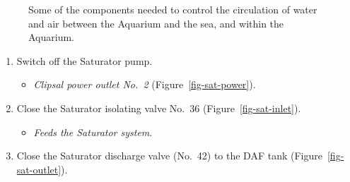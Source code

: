 \documentclass[
  12pt,
]{report}
\providecommand{\tightlist}{%
  \setlength{\itemsep}{0pt}\setlength{\parskip}{0pt}}\usepackage{longtable,booktabs,array}
\begin{document}
\begin{figure}[H]

\begin{minipage}[t]{0.33\linewidth}

{\centering 


}

\end{minipage}%
%
\begin{minipage}[t]{0.33\linewidth}

{\centering 


}

\end{minipage}%
%
\begin{minipage}[t]{0.33\linewidth}

{\centering 


}

\end{minipage}%

\caption{\label{fig-seacirc}Some of the components needed to control the
circulation of water and air between the Aquarium and the sea, and
within the Aquarium.}

\end{figure}

\begin{enumerate}
\def\labelenumi{\arabic{enumi}.}
\setcounter{enumi}{3}
\tightlist
\item
  Switch off the Saturator pump.

  \begin{itemize}
  \tightlist
  \item
    \emph{Clipsal power outlet No.~2} (Figure~\ref{fig-sat-power}).
  \end{itemize}
\item
  Close the Saturator isolating valve No.~36
  (Figure~\ref{fig-sat-inlet}).

  \begin{itemize}
  \tightlist
  \item
    \emph{Feeds the Saturator system}.
  \end{itemize}
\item
  Close the Saturator discharge valve (No.~42) to the DAF tank
  (Figure~\ref{fig-sat-outlet}).
\end{enumerate}
\end{document}
